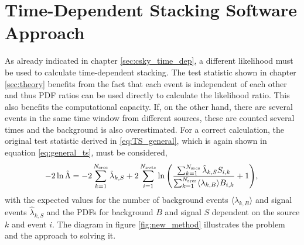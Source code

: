 \chapter{Time-Dependent Stacking Software Approach} \label{sec:tdepps}

As already indicated in chapter \ref{sec:csky_time_dep}, a different likelihood must be used to calculate time-dependent stacking.
The test statistic shown in chapter \ref{sec:theory} benefits from the fact that each event is independent of each other and thus PDF ratios can be used directly to calculate the likelihood ratio.
This also benefits the computational capacity.
If, on the other hand, there are several events in the same time window from different sources, these are counted several times and the background is also overestimated.
For a correct calculation, the original test statistic derived in \eqref{eq:TS_general}, which is again shown in equation \eqref{eq:general_ts}, must be considered,
\begin{equation}
    -2\ln{\hat{\Lambda}} = -2\sum_{k=1}^{N_{\text{srcs}}}\hat{\lambda}_{k,S} + 2\sum_{i=1}^{N_{evts}}\ln{\left(\frac{\sum_{k=1}^{N_{\text{srcs}}}\hat{\lambda}_{k,S}S_{i,k}}{\sum_{k=1}^{N_{\text{srcs}}}\langle\lambda_{k,B}\rangle B_{i,k}}+1\right)} \label{eq:general_ts}, \\
\end{equation}
with the expected values for the number of background events $\langle\lambda_{k,B}\rangle$ and signal events  $\hat{\lambda}_{k,S}$ and the PDFs for background $B$ and signal $S$ dependent on the source $k$ and event $i$.
The diagram in figure \ref{fig:new_method} illustrates the problem and the approach to solving it.

